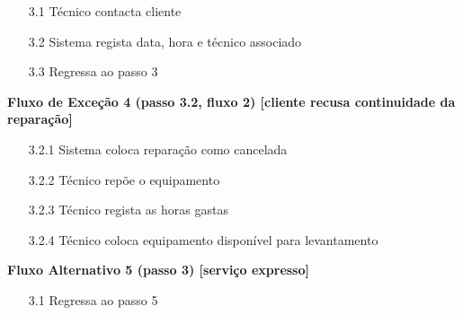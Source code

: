 \documentclass[../relatorio.tex]{subfiles}
\begin{document}
\begin{itemize}
\begin{flushleft}
          \end{flushleft}
          \begin{itemize}
              \item[3.1]{Técnico contacta cliente}
              \item[3.2]{Sistema regista data, hora e técnico associado}
              \item[3.3]{Regressa ao passo 3}
          \end{itemize}
          \begin{flushleft}
              \textbf{Fluxo de Exceção 4 (passo 3.2, fluxo 2) [cliente recusa continuidade da reparação]}
          \end{flushleft}
          \begin{itemize}
              \item[3.2.1]{Sistema coloca reparação como cancelada}
              \item[3.2.2]{Técnico repõe o equipamento}
              \item[3.2.3]{Técnico regista as horas gastas}
              \item[3.2.4]{Técnico coloca equipamento disponível para levantamento}
          \end{itemize}
          \begin{flushleft}
              \textbf{Fluxo Alternativo 5 (passo 3) [serviço expresso]}
          \end{flushleft}
          \begin{itemize}
              \item[3.1]{Regressa ao passo 5}
          \end{itemize}
\end{itemize}
\end{document}
